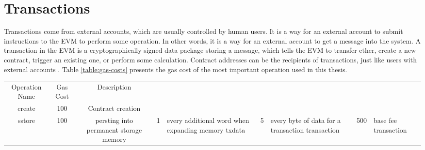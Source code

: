\section{Transactions}
Transactions come from external accounts, which are usually controlled by human users. It is a way for an external account to submit instructions to the EVM to perform some operation. In other words, it is a way for an external account to get a message into the system. A transaction in the EVM is a cryptographically signed data package storing a message, which tells the EVM to transfer ether, create a new contract, trigger an existing one, or perform some calculation. Contract addresses can be the recipients of transactions, just like users with external accounts \cite[60]{dannen2017introducing}. 
Table \ref{table:gas-costs} presents the gas cost of the most important operation used in this thesis.
\begin{center}
    \begin{tabular}{ c c c }\label{table:gas-costs}
     Operation Name & Gas Cost & Description \\ 
     create & 100 & Contract creation \\  
     sstore & 100 & persting into permanent storage    
     memory & 1 & every additional word when expanding memory
     txdata & 5 & every byte of data for a transaction
     transaction & 500 & base fee transaction
    \end{tabular}
\end{center}